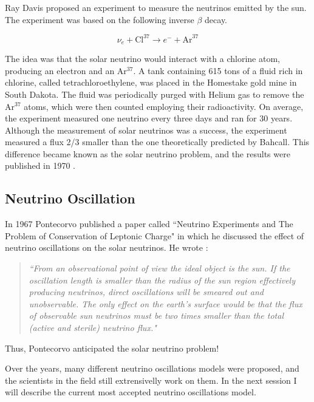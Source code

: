 Ray Davis proposed an experiment to measure the neutrinos emitted by the sun. The experiment was based on the following inverse $\beta$ decay.

\begin{equation}
		\nu_e + \textrm{Cl}^{37} \longrightarrow e^- +\textrm{Ar}^{37}
		\label{solar_reaction}
\end{equation}

The idea was that the solar neutrino would interact with a chlorine atom, producing an electron and an Ar$^{37}$. A tank containing 615 tons of a fluid rich in chlorine, called tetrachloroethylene, was placed in the Homestake gold mine in South Dakota. The fluid was periodically purged with Helium gas to remove the Ar$^{37}$ atoms, which were then counted employing their radioactivity. On average, the experiment measured one neutrino every three days and ran for 30 years. Although the measurement of solar neutrinos was a success, the experiment measured a flux 2/3 smaller than the one theoretically predicted by Bahcall. This difference became known as the solar neutrino problem, and the results were published in 1970 \cite{the_story_of_the_neutrino}.

\subsection{Neutrino Oscillation}

In 1967 Pontecorvo published a paper called ``Neutrino Experiments and The Problem of Conservation of Leptonic Charge" in which he discussed the effect of neutrino oscillations on the solar neutrinos. He wrote \cite{pontecorvo_1967}: 
\begin{quote}
\emph{``From an observational point of view the ideal object is the sun. If the oscillation length is smaller than the radius of the sun region effectively producing neutrinos, direct oscillations will be smeared out and unobservable. The only effect on the earth’s surface would be that the flux of observable sun neutrinos must be two times smaller than the total (active and sterile) neutrino flux."}
\end{quote}

Thus, Pontecorvo anticipated the solar neutrino problem!

Over the years, many different neutrino oscillations models were proposed, and the scientists in the field still extrensivelly work on them. In the next session I will describe the current most accepted neutrino oscillations model. 

